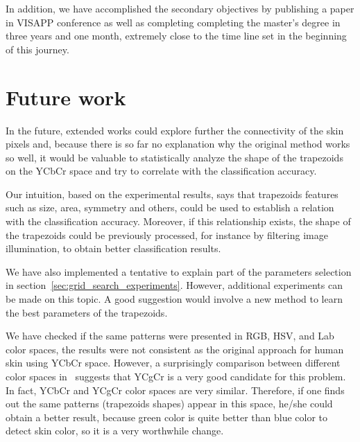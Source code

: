 In addition, we have accomplished the secondary objectives by publishing a paper in VISAPP conference as well as completing completing the master's degree in three years and one month, extremely close to the time line set in the beginning of this journey.


\section{Future work}
\label{sec:future_work}

In the future, extended works could explore further the connectivity of the skin pixels and, because there is so far no explanation why the original method works so well, it would be valuable to statistically analyze the shape of the trapezoids on the YCbCr space and try to correlate with the classification accuracy.

Our intuition, based on the experimental results, says that trapezoids features such as size, area, symmetry and others, could be used to establish a relation with the classification accuracy. Moreover, if  this relationship exists, the shape of the trapezoids could be previously processed, for instance by filtering image illumination, to obtain better classification results.

We have also implemented a tentative to explain part of the parameters selection in section~\ref{sec:grid_search_experiments}. However, additional experiments can be made on this topic. A good suggestion would involve a new method to learn the best parameters of the trapezoids.

We have checked if the same patterns were presented in RGB, HSV, and Lab color spaces, the results were not consistent as the original approach for human skin using YCbCr space. However, a surprisingly comparison between different color spaces in~\citet{chaves:10} suggests that YCgCr is a very good candidate for this problem. In fact, YCbCr and YCgCr color spaces are very similar. Therefore, if one finds out the same patterns (trapezoids shapes) appear in this space, he/she could obtain a better result, because green color is quite better than blue color to detect skin color, so it is a very worthwhile change.